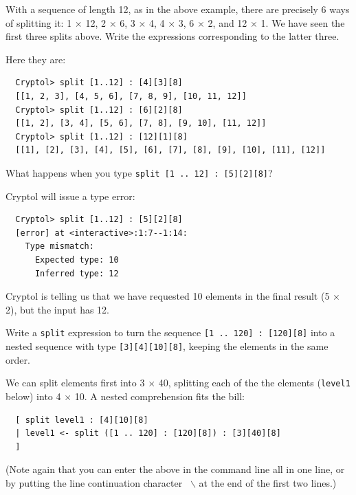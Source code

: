 \begin{Exercise}\label{ex:split:0}
  With a sequence of length 12, as in the above example, there are
  precisely 6 ways of splitting it: 1 $\times$ 12, 2 $\times$ 6, 3
  $\times$ 4, 4 $\times$ 3, 6 $\times$ 2, and 12 $\times$ 1. We have
  seen the first three splits above. Write the expressions
  corresponding to the latter three.\indSplit
\end{Exercise}
\begin{Answer}
Here they are:\indSplit
\begin{Verbatim}
  Cryptol> split [1..12] : [4][3][8]
  [[1, 2, 3], [4, 5, 6], [7, 8, 9], [10, 11, 12]]
  Cryptol> split [1..12] : [6][2][8]
  [[1, 2], [3, 4], [5, 6], [7, 8], [9, 10], [11, 12]]
  Cryptol> split [1..12] : [12][1][8]
  [[1], [2], [3], [4], [5], [6], [7], [8], [9], [10], [11], [12]]
\end{Verbatim}
\end{Answer}

\begin{Exercise}\label{ex:split:1}
  What happens when you type
  \texttt{split [1 ..\ 12] :\ [5][2][8]}?\indSplit
\end{Exercise}
\begin{Answer}
Cryptol will issue a type error:\indSplit
\begin{Verbatim}
  Cryptol> split [1..12] : [5][2][8]
  [error] at <interactive>:1:7--1:14:
    Type mismatch:
      Expected type: 10
      Inferred type: 12
\end{Verbatim}
Cryptol is telling us that we have requested 10 elements in the final
result (5 $\times$ 2), but the input has 12.
\end{Answer}

\begin{Exercise}\label{ex:split:2}
  Write a \texttt{split} expression to turn the sequence \texttt{[1 ..\ 120]
    :\ [120][8]} into a nested sequence with type {\tt [3][4][10][8]},
  keeping the elements in the same order.\indSplit {}  \indComp
\end{Exercise}
\begin{Answer}
  We can split elements first into 3 $\times$ 40, splitting each
  of the the elements ({\tt level1} below) into 4 $\times$ 10. A nested
  comprehension fits the bill:\indComp
\begin{Verbatim}
  [ split level1 : [4][10][8]
  | level1 <- split ([1 .. 120] : [120][8]) : [3][40][8]
  ]
\end{Verbatim}
(Note again that you can enter the above in the command line all in
one line, or by putting the line continuation character {\tt
  $\backslash$} at the end of the first two lines.)\indLineCont
{}
\end{Answer}

